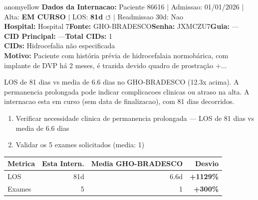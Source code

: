 \documentclass[a4paper,10pt]{article}
\begin{document}
\begin{anomalycard}[Internacao 110443 | GHO-BRADESCO | MODERADO (z=2.61)]{anomyellow}
\textbf{Dados da Internacao:} Paciente 86616 $\mid$ Admissao: 01/01/2026 $\mid$ Alta: \textcolor{anomorange}{\textbf{EM CURSO}} $\mid$ LOS: \textbf{81d \textcolor{anomorange}{$\circlearrowleft$}} $\mid$ Readmissao 30d: Nao\\
\textbf{Hospital:} Hospital 7\quad\textbf{Fonte:} GHO-BRADESCO\quad\textbf{Senha:} JXMCZU7\quad\textbf{Guia:} ---\\
\textbf{CID Principal:} {\small ---}\quad\textbf{Total CIDs:} 1\\

\textbf{CIDs:} {\scriptsize Hidrocefalia não especificada}\\

\textbf{Motivo:} {\scriptsize Paciente com história prévia de hidrocefalaia normobárica, com implante de DVP há 2 meses, é trazida devido quadro de prostração +...}\\

\vspace{2pt}\begin{tcolorbox}[colback=severityred!20,colframe=anomyellow,title={\textbf{Interpretacao de Negocio}},fonttitle=\bfseries\small,left=4pt,right=4pt,top=3pt,bottom=3pt]
{\small LOS de 81 dias vs media de 6.6 dias no GHO-BRADESCO (12.3x acima). A permanencia prolongada pode indicar complicacoes clinicas ou atraso na alta. A internacao esta em curso (sem data de finalizacao), com 81 dias decorridos.}
\end{tcolorbox}
\begin{tcolorbox}[colback=severityyellow!30,colframe=anomorange,title={\textbf{Recomendacoes Especificas}},fonttitle=\bfseries\small,left=4pt,right=4pt,top=3pt,bottom=3pt]
\begin{enumerate}[nosep,leftmargin=16pt]
\item {\small Verificar necessidade clinica de permanencia prolongada --- LOS de 81 dias vs media de 6.6 dias}
\item {\small Validar os 5 exames solicitados (media: 1)}
\end{enumerate}
\end{tcolorbox}
\begin{center}\begin{tabular}{l r r r}\toprule\textbf{Metrica} & \textbf{Esta Intern.} & \textbf{Media GHO-BRADESCO} & \textbf{Desvio} \\\midrule
LOS & 81d & 6.6d & \textcolor{anomred}{\textbf{+1129\%}} \\
Exames & 5 & 1 & \textcolor{anomred}{\textbf{+300\%}} \\
\bottomrule\end{tabular}\end{center}


\end{anomalycard}
\end{document}
